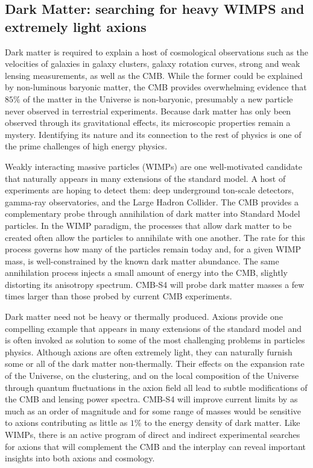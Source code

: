 \subsection*{Dark Matter: searching for heavy WIMPS and extremely light axions}


Dark matter is required to explain a host of cosmological observations such as the velocities of galaxies in galaxy clusters, galaxy rotation curves, strong and weak lensing measurements, as well as the CMB. While the former could be explained by non-luminous baryonic matter, the CMB provides overwhelming evidence that $85\%$ of the matter in the Universe is non-baryonic, presumably a new particle never observed in terrestrial experiments. Because dark matter has only been observed through its gravitational effects, its microscopic properties remain a mystery. Identifying its nature and its connection to the rest of physics is one of the prime challenges of high energy physics.

Weakly interacting massive particles (WIMPs) are one well-motivated candidate that naturally appears in many extensions of the standard model. A host of experiments are hoping to detect them: deep underground ton-scale detectors, gamma-ray observatories, and the Large Hadron Collider. The CMB provides a complementary probe through annihilation of dark matter into Standard Model particles.   In the WIMP paradigm, the processes that allow dark matter to be created often allow the particles to annihilate with one another. The rate for this process governs how many of the particles remain today and, for a given WIMP mass, is well-constrained by the known dark matter abundance. The same annihilation process injects a small amount of energy into the CMB, slightly distorting its anisotropy spectrum. CMB-S4 will probe dark matter masses a few times larger than those probed by current CMB experiments.%

Dark matter need not be heavy or thermally produced. Axions provide one compelling example that appears in many extensions of the standard model and is often invoked as solution to some of the most challenging problems in particles physics. Although axions are often extremely light, they can naturally furnish some or all of the dark matter non-thermally. Their effects on the expansion rate of the Universe, on the clustering, and on the local composition of the Universe through quantum fluctuations in the axion field all lead to subtle modifications of the CMB and lensing power spectra. CMB-S4 will improve current limits by as much as an order of magnitude and for some range of masses would be sensitive to axions contributing as little as $1\%$ to the energy density of dark matter.  Like WIMPs, there is an active program of direct and indirect experimental searches for axions that will complement the CMB and the interplay can reveal important insights into both axions and cosmology.

